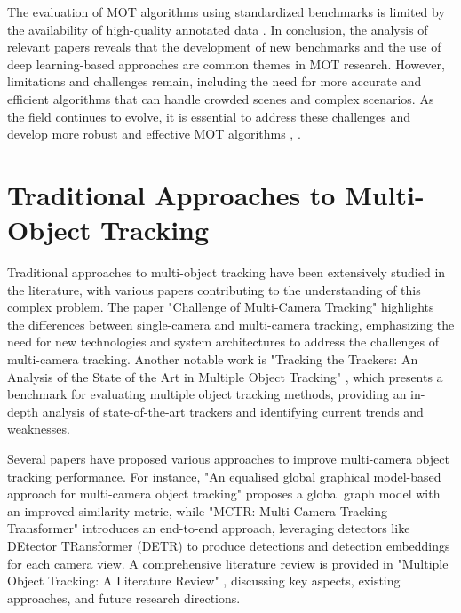 \documentclass[conference]{IEEEtran}
\begin{document}
The evaluation of MOT algorithms using standardized benchmarks is limited by the availability of high-quality annotated data \cite{MOTChallenge: A Benchmark for Multi-Object Tracking}. In conclusion, the analysis of relevant papers reveals that the development of new benchmarks and the use of deep learning-based approaches are common themes in MOT research. However, limitations and challenges remain, including the need for more accurate and efficient algorithms that can handle crowded scenes and complex scenarios. As the field continues to evolve, it is essential to address these challenges and develop more robust and effective MOT algorithms \cite{Multiple Object Tracking: A Review}, \cite{A Comprehensive Review of Multiple Object Tracking Techniques}.

\section{Traditional Approaches to Multi-Object Tracking}
Traditional approaches to multi-object tracking have been extensively studied in the literature, with various papers contributing to the understanding of this complex problem. The paper "Challenge of Multi-Camera Tracking" \cite{Challenge of Multi-Camera Tracking} highlights the differences between single-camera and multi-camera tracking, emphasizing the need for new technologies and system architectures to address the challenges of multi-camera tracking. Another notable work is "Tracking the Trackers: An Analysis of the State of the Art in Multiple Object Tracking" \cite{Tracking the Trackers: An Analysis of the State of the Art in Multiple Object Tracking}, which presents a benchmark for evaluating multiple object tracking methods, providing an in-depth analysis of state-of-the-art trackers and identifying current trends and weaknesses.

Several papers have proposed various approaches to improve multi-camera object tracking performance. For instance, "An equalised global graphical model-based approach for multi-camera object tracking" \cite{An equalised global graphical model-based approach for multi-camera object tracking} proposes a global graph model with an improved similarity metric, while "MCTR: Multi Camera Tracking Transformer" \cite{MCTR: Multi Camera Tracking Transformer} introduces an end-to-end approach, leveraging detectors like DEtector TRansformer (DETR) to produce detections and detection embeddings for each camera view. A comprehensive literature review is provided in "Multiple Object Tracking: A Literature Review" \cite{Multiple Object Tracking: A Literature Review}, discussing key aspects, existing approaches, and future research directions.
\end{document}
